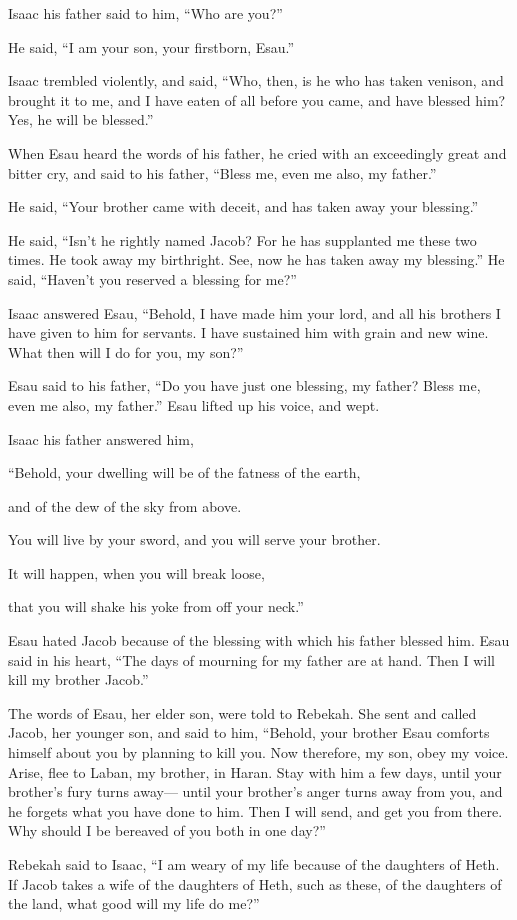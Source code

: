 {\par }{\PP {}Isaac his father said to him, “Who are you?”
\par }{\PP He said, “I am your son, your firstborn, Esau.”
\par }{\PP {}Isaac trembled violently, and said, “Who, then, is he who has taken venison, and brought it to me, and I have eaten of all before you came, and have blessed him? Yes, he will be blessed.”
\par }{\PP {}When Esau heard the words of his father, he cried with an exceedingly great and bitter cry, and said to his father, “Bless me, even me also, my father.”
\par }{\PP {}He said, “Your brother came with deceit, and has taken away your blessing.”
\par }{\PP {}He said, “Isn’t he rightly named Jacob? For he has supplanted me these two times. He took away my birthright. See, now he has taken away my blessing.” He said, “Haven’t you reserved a blessing for me?”
\par }{\PP {}Isaac answered Esau, “Behold, I have made him your lord, and all his brothers I have given to him for servants. I have sustained him with grain and new wine. What then will I do for you, my son?”
\par }{\PP {}Esau said to his father, “Do you have just one blessing, my father? Bless me, even me also, my father.” Esau lifted up his voice, and wept.
\par }{\PP {}Isaac his father answered him,
\par }{\Q “Behold, your dwelling will be of the fatness of the earth,
\par }{\Q and of the dew of the sky from above.
\par }{\Q {}You will live by your sword, and you will serve your brother.
\par }{\Q It will happen, when you will break loose,
\par }{\Q that you will shake his yoke from off your neck.”
\par }{\PP {}Esau hated Jacob because of the blessing with which his father blessed him. Esau said in his heart, “The days of mourning for my father are at hand. Then I will kill my brother Jacob.”
\par }{\PP {}The words of Esau, her elder son, were told to Rebekah. She sent and called Jacob, her younger son, and said to him, “Behold, your brother Esau comforts himself about you by planning to kill you.
Now therefore, my son, obey my voice. Arise, flee to Laban, my brother, in Haran.
Stay with him a few days, until your brother’s fury turns away—
until your brother’s anger turns away from you, and he forgets what you have done to him. Then I will send, and get you from there. Why should I be bereaved of you both in one day?”
\par }{\PP {}Rebekah said to Isaac, “I am weary of my life because of the daughters of Heth. If Jacob takes a wife of the daughters of Heth, such as these, of the daughters of the land, what good will my life do me?”

}
